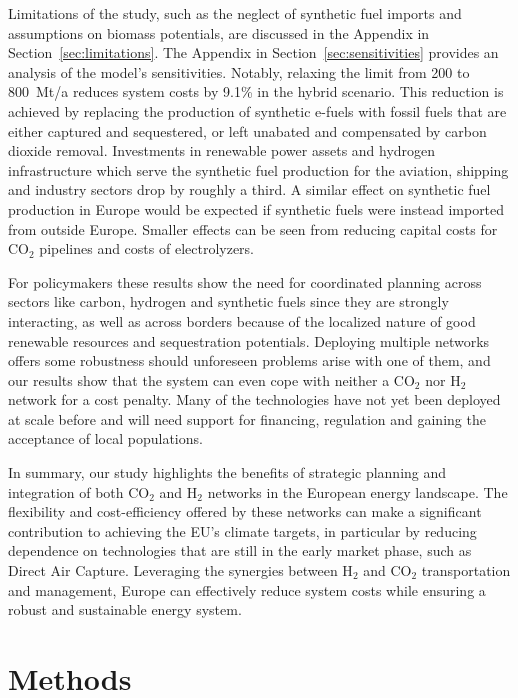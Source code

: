 \documentclass[twocolumn]{article}
\newcommand{\carbon}{CO$_2$}
\newcommand{\hydrogen}{H$_2$}
\begin{document}
Limitations of the study, such as the neglect of synthetic fuel imports and assumptions on biomass potentials, are discussed in the Appendix in Section~\ref{sec:limitations}.
The Appendix in Section~\ref{sec:sensitivities} provides an analysis of the model's sensitivities. Notably, relaxing the limit from 200 to 800~Mt/a reduces system costs by 9.1\% in the hybrid scenario. This reduction is achieved by replacing the production of synthetic e-fuels with fossil fuels that are either captured and sequestered, or left unabated and compensated by carbon dioxide removal. Investments in renewable power assets and hydrogen infrastructure which serve the synthetic fuel production for the aviation, shipping and industry sectors drop by roughly a third. A similar effect on synthetic fuel production in Europe would be expected if synthetic fuels were instead imported from outside Europe. Smaller effects can be seen from reducing capital costs for \carbon{} pipelines and costs of electrolyzers.

For policymakers these results show the need for coordinated planning across sectors like carbon, hydrogen and synthetic fuels since they are strongly interacting, as well as across borders because of the localized nature of good renewable resources and sequestration potentials. Deploying multiple networks offers some robustness should unforeseen problems arise with one of them, and our results show that the system can even cope with neither a \carbon{} nor \hydrogen{} network for a cost penalty.  Many of the technologies have not yet been deployed at scale before and will need support for financing, regulation and gaining the acceptance of local populations.

In summary, our study highlights the benefits of strategic planning and integration of both \carbon{} and \hydrogen{} networks in the European energy landscape. The flexibility and cost-efficiency offered by these networks can make a significant contribution to achieving the EU's climate targets, in particular by reducing dependence on technologies that are still in the early market phase, such as Direct Air Capture. Leveraging the synergies between \hydrogen{} and \carbon{} transportation and management, Europe can effectively reduce system costs while ensuring a robust and sustainable energy system.


\section*{Methods}
\label{sec:methodology}
\end{document}
